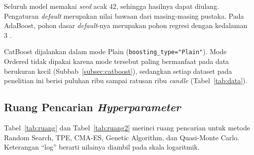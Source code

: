 Seluruh model memakai \textit{seed} acak 42, sehingga hasilnya dapat diulang.
Pengaturan \textit{default} merupakan nilai bawaan dari masing-masing pustaka.
Pada AdaBoost, pohon dasar \textit{default}-nya merupakan pohon regresi dengan kedalaman
3 \cite{sklearnadaboost}.

CatBoost dijalankan dalam mode Plain (\texttt{boosting\_type="Plain"}). Mode
Ordered tidak dipakai karena mode tersebut paling bermanfaat pada data
berukuran kecil (Subbab~\ref{subsec:catboost}), sedangkan setiap dataset pada
penelitian ini berisi puluhan ribu sampai ratusan ribu \textit{candle}
(Tabel~\ref{tab:data}).

\subsection{Ruang Pencarian \textit{Hyperparameter}}
Tabel~\ref{tab:ruang} dan Tabel~\ref{tab:ruang2} merinci ruang pencarian
untuk metode Random Search, TPE, CMA-ES, Genetic Algorithm, dan Quasi-Monte
Carlo. Keterangan ``log'' berarti nilainya diambil pada skala logaritmik.

